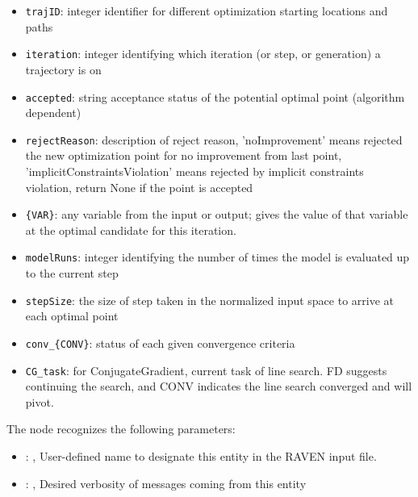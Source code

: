        \begin{itemize}
          \item \texttt{trajID}: integer identifier for different optimization starting locations and paths
             \item \texttt{iteration}: integer identifying which iteration (or step, or generation) a trajectory is on
             \item \texttt{accepted}: string acceptance status of the potential optimal point (algorithm dependent)
             \item \texttt{rejectReason}: description of reject reason, 'noImprovement' means rejected the new optimization point for no improvement from last point, 'implicitConstraintsViolation' means rejected by implicit constraints violation, return None if the point is accepted
             \item \texttt{\{VAR\}}: any variable from the  input or output; gives the value of that variable at the optimal candidate for this iteration.
             \item \texttt{modelRuns}: integer identifying the number of times the model is evaluated up to the current step
             \item \texttt{stepSize}: the size of step taken in the normalized input space to arrive at each optimal point
             \item \texttt{conv\_\{CONV\}}: status of each given convergence criteria
             \item \texttt{CG\_task}: for ConjugateGradient, current task of line search. FD suggests continuing the search, and CONV indicates the line search converged and will pivot.

         \end{itemize}

  The  node recognizes the following parameters:
    \begin{itemize}
      \item {}: ,
        User-defined name to designate this entity in the RAVEN input file.
      \item {}: ,
        Desired verbosity of messages coming from this entity
  \end{itemize}

